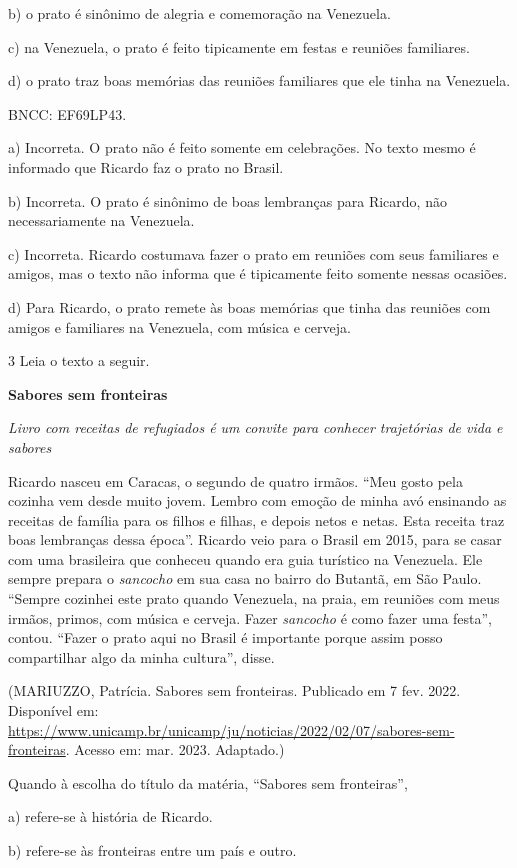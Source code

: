 {b) o prato é sinônimo de alegria e comemoração na Venezuela.

c) na Venezuela, o prato é feito tipicamente em festas e reuniões
familiares.

d) o prato traz boas memórias das reuniões familiares que ele tinha na
Venezuela.

BNCC: EF69LP43.

a) Incorreta. O prato não é feito somente em celebrações. No texto mesmo
é informado que Ricardo faz o prato no Brasil.

b) Incorreta. O prato é sinônimo de boas lembranças para Ricardo, não
necessariamente na Venezuela.

c) Incorreta. Ricardo costumava fazer o prato em reuniões com seus
familiares e amigos, mas o texto não informa que é tipicamente feito
somente nessas ocasiões.

d) Para Ricardo, o prato remete às boas memórias que tinha das reuniões
com amigos e familiares na Venezuela, com música e cerveja.

\num{3} Leia o texto a seguir.

\textbf{Sabores sem fronteiras}

\emph{Livro com receitas de refugiados é um convite para conhecer
trajetórias de vida e sabores}

Ricardo nasceu em Caracas, o segundo de quatro irmãos. ``Meu gosto pela
cozinha vem desde muito jovem. Lembro com emoção de minha avó ensinando
as receitas de família para os filhos e filhas, e depois netos e netas.
Esta receita traz boas lembranças dessa época''. Ricardo veio para o
Brasil em 2015, para se casar com uma brasileira que conheceu quando era
guia turístico na Venezuela. Ele sempre prepara o \emph{sancocho} em sua
casa no bairro do Butantã, em São Paulo. ``Sempre cozinhei este prato
quando Venezuela, na praia, em reuniões com meus irmãos, primos, com
música e cerveja. Fazer \emph{sancocho} é como fazer uma festa'',
contou. ``Fazer o prato aqui no Brasil é importante porque assim posso
compartilhar algo da minha cultura'', disse.

(MARIUZZO, Patrícia. Sabores sem fronteiras. Publicado em 7 fev. 2022.
Disponível em:
\url{https://www.unicamp.br/unicamp/ju/noticias/2022/02/07/sabores-sem-fronteiras}.
Acesso em: mar. 2023. Adaptado.)

Quando à escolha do título da matéria, ``Sabores sem fronteiras'',

a) refere-se à história de Ricardo.

b) refere-se às fronteiras entre um país e outro.

}
